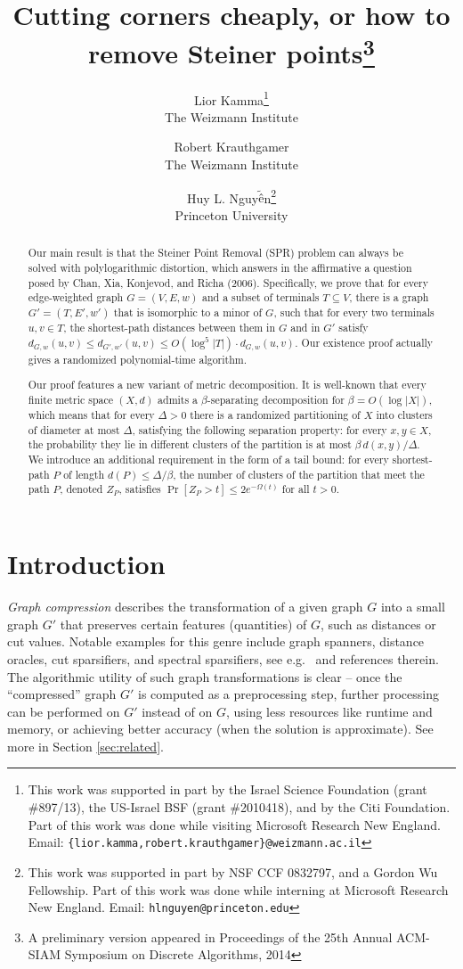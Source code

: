 \documentclass[twoside,leqno,twocolumn]{article}
\title{Cutting corners cheaply, or how to remove Steiner points\thanks{A preliminary version appeared in Proceedings of the 25th Annual ACM-SIAM
Symposium on Discrete Algorithms, 2014}}
\author{Lior Kamma\thanks{This work was supported in part by the Israel Science Foundation (grant 
\#897/13), the US-Israel BSF (grant \#2010418), and by the Citi Foundation.
Part of this work was done while visiting Microsoft Research New England.
Email: \texttt{\{lior.kamma,robert.krauthgamer\}@weizmann.ac.il}
}
\\ The Weizmann Institute
\and Robert Krauthgamer\footnotemark[\value{footnote}]
\\ The Weizmann Institute
\and Huy L. Nguy$\tilde{\mbox{\^{e}}}$n\thanks{This work was supported in part by NSF CCF 0832797, and a Gordon Wu Fellowship.
Part of this work was done while interning at Microsoft Research New England.
Email: \texttt{hlnguyen@princeton.edu}
}
\\ Princeton University
}
\date{}
\providecommand{\card}[1]{\lvert#1\rvert}
\begin{document}
\maketitle

\begin{abstract}
\ifprocs
  \small \fi
Our main result is that the Steiner Point Removal (SPR) problem
can always be solved with polylogarithmic distortion,
which answers in the affirmative 
a question posed by Chan, Xia, Konjevod, and Richa (2006).
Specifically, we prove that for every edge-weighted graph $G = (V,E,w)$
and a subset of terminals $T \subseteq V$, 
there is a graph $G'=(T,E',w')$ that is isomorphic to a minor of $G$,
such that for every two terminals $u,v\in T$,
the shortest-path distances between them in $G$ and in $G'$ satisfy
$d_{G,w}(u,v) \le d_{G',w'}(u,v) \le O(\log^5|T|) \cdot d_{G,w}(u,v)$.
Our existence proof actually gives a randomized polynomial-time algorithm.

\ifprocs
  \small \fi
Our proof features a new variant of metric decomposition.
It is well-known that every finite metric space $(X,d)$ admits 
a $\beta$-separating decomposition for $\beta=O(\log \card{X})$, 
which means that for every $\Delta>0$ there is a randomized 
partitioning of $X$ into clusters of diameter at most $\Delta$,
satisfying the following separation property:
for every $x,y \in X$, the probability they lie in different clusters 
of the partition is at most $\beta\,d(x,y)/\Delta$. 
We introduce an additional requirement in the form of a tail bound:
for every shortest-path $P$ of length $d(P) \leq \Delta/\beta$, 
the number of clusters of the partition that meet the path $P$, denoted $Z_P$,
satisfies $\Pr[Z_P > t] \le 2e^{-\Omega(t)}$ for all $t>0$.
\end{abstract}


\section{Introduction}

\emph{Graph compression} describes the transformation of a given graph $G$ 
into a small graph $G'$ that preserves certain features (quantities) of $G$,
such as distances or cut values.
Notable examples for this genre include graph spanners, distance oracles,
cut sparsifiers, and spectral sparsifiers, 
see e.g.\ \cite{PS89,TZ05,BK96,BSS08} and references therein.
The algorithmic utility of such graph transformations is clear  -- 
once the ``compressed'' graph $G'$ is computed as a preprocessing step,
further processing can be performed on $G'$ instead of on $G$,
using less resources like runtime and memory, 
or achieving better accuracy (when the solution is approximate). 
See more in Section \ref{sec:related}.
\end{document}
